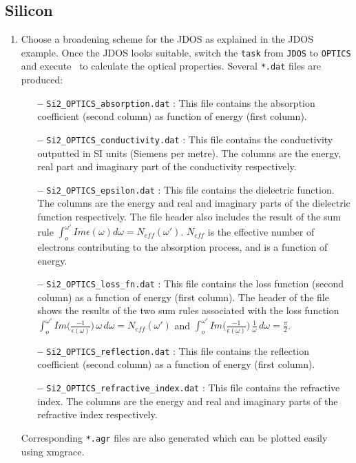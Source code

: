 \documentclass[a4paper,11pt,twoside]{book}
\begin{document}
{\subsection{Silicon}
\begin{enumerate}
\item Choose a broadening scheme for the JDOS as explained in the JDOS example.  Once the JDOS looks suitable, switch the \verb#task# from \verb#JDOS# to \verb#OPTICS# and execute \optados\ to calculate the optical properties.  Several \verb#*.dat# files are produced:
\begin{itemize}
\item[{\bf --}] \verb#Si2_OPTICS_absorption.dat# : This file contains the absorption coefficient (second column) as function of energy (first column).
\item[{\bf --}] \verb#Si2_OPTICS_conductivity.dat# : This file contains the conductivity outputted in SI units (Siemens per metre).  The columns are the energy, real part  and imaginary part of the conductivity respectively.
\item[{\bf --}] \verb#Si2_OPTICS_epsilon.dat# : This file contains the dielectric function.  The columns are the energy and real and imaginary parts of the dielectric function respectively. The file header also includes the result of the sum rule $\int_o^{\omega'}Im\epsilon{}(\omega{})d\omega = N_{eff}(\omega')$.  $N_{eff}$ is the effective number of electrons contributing to the absorption process, and is a function of energy.
\item[{\bf --}] \verb#Si2_OPTICS_loss_fn.dat# : This file contains the loss function (second column) as a function of energy (first column).  The header of the file shows the results of the two sum rules associated with the loss function $\int_o^{\omega'}Im\Big(\frac{-1}{\epsilon{}(\omega{})}\Big)\,\omega{}\,d\omega = N_{eff}(\omega')$ and $\int_o^{\omega'}Im\Big(\frac{-1}{\epsilon{}(\omega{})}\Big)\,\frac{1}{\omega}\,d\omega = \frac{\pi}{2}$.
\item[{\bf --}] \verb#Si2_OPTICS_reflection.dat# : This file contains the reflection coefficient (second column) as a function of energy (first column).
\item[{\bf --}] \verb#Si2_OPTICS_refractive_index.dat# : This file contains the refractive index.  The columns are the energy and real and imaginary parts of the refractive index respectively.
\end{itemize}
Corresponding \verb#*.agr# files are also generated which can be plotted easily using xmgrace.


\end{enumerate}}
\end{document}
